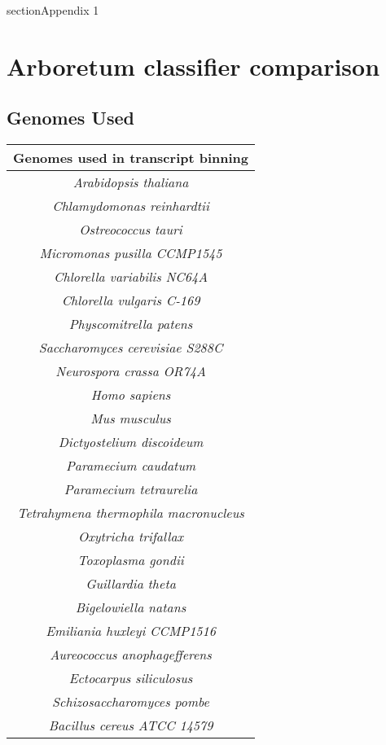 \graphicspath{{appendices/appendix_1/figures}}
section{Appendix 1}

\section{Arboretum classifier comparison}

\subsection{Genomes Used}
\begin{table}
	\begin{tabular}{|c|}
		\hline 
		\textbf{Genomes used in transcript binning}\\
		\hline
		\textit{Arabidopsis thaliana} \\
		\textit{Chlamydomonas reinhardtii} \\
		\textit{Ostreococcus tauri} \\
		\textit{Micromonas pusilla CCMP1545} \\  
		\textit{Chlorella variabilis NC64A} \\
		\textit{Chlorella vulgaris C-169} \\
		\textit{Physcomitrella patens} \\
		\textit{Saccharomyces cerevisiae S288C} \\ 
		\textit{Neurospora crassa OR74A}\\
		\textit{Homo sapiens}\\
		\textit{Mus musculus}\\
		\textit{Dictyostelium discoideum}\\
		\textit{Paramecium caudatum}\\
		\textit{Paramecium tetraurelia}\\
		\textit{Tetrahymena thermophila macronucleus}\\
		\textit{Oxytricha trifallax}\\
		\textit{Toxoplasma gondii}\\
		\textit{Guillardia theta}\\
		\textit{Bigelowiella natans}\\
		\textit{Emiliania huxleyi CCMP1516}\\
		\textit{Aureococcus anophagefferens}\\
		\textit{Ectocarpus siliculosus}\\
		\textit{Schizosaccharomyces pombe}\\
		\textit{Bacillus cereus ATCC 14579}\\

\end{tabular}
\end{table}
